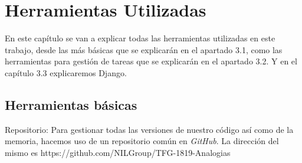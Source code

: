 \chapter{Herramientas Utilizadas}
\label{cap:herramientas}

En este capítulo se van a explicar todas las herramientas utilizadas en este trabajo, desde las más básicas que se explicarán en el apartado 3.1, como las herramientas para gestión de tareas que se explicarán en el apartado 3.2. Y en el capítulo 3.3 explicaremos  Django.


\section{Herramientas básicas}
\label{cap:sec:herramientasBasicas}
	
	
    Repositorio: Para gestionar todas las versiones de nuestro código así como de la memoria, hacemos uso de un repositorio común en \textit{GitHub}. 
	La dirección del mismo es https://github.com/NILGroup/TFG-1819-Analogias



